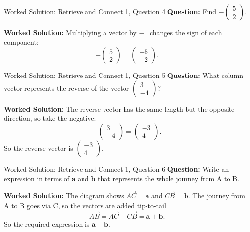 \documentclass{beamer}
\begin{document}
\begin{frame}{Worked Solution: Retrieve and Connect 1, Question 4}
\textbf{Question:} Find \(-\begin{pmatrix}5\\2\end{pmatrix}\).

\textbf{Worked Solution:}
Multiplying a vector by \(-1\) changes the sign of each component:
\[
-\begin{pmatrix}5\\2\end{pmatrix}
=
\begin{pmatrix}-5\\-2\end{pmatrix}.
\]

\end{frame}

\begin{frame}{Worked Solution: Retrieve and Connect 1, Question 5}
\textbf{Question:} What column vector represents the reverse of the vector \(\begin{pmatrix}3\\-4\end{pmatrix}\)?

\textbf{Worked Solution:}
The reverse vector has the same length but the opposite direction, so take the negative:
\[
-\begin{pmatrix}3\\-4\end{pmatrix}
=
\begin{pmatrix}-3\\4\end{pmatrix}.
\]
So the reverse vector is \(\begin{pmatrix}-3\\4\end{pmatrix}\).

\end{frame}

\begin{frame}{Worked Solution: Retrieve and Connect 1, Question 6}
\textbf{Question:} Write an expression in terms of \(\mathbf{a}\) and \(\mathbf{b}\) that represents the whole journey from A to B.

\textbf{Worked Solution:}
The diagram shows \(\overrightarrow{AC}=\mathbf{a}\) and \(\overrightarrow{CB}=\mathbf{b}\). The journey from A to B goes via C, so the vectors are added tip-to-tail:
\[
\overrightarrow{AB}
=
\overrightarrow{AC}+\overrightarrow{CB}
=
\mathbf{a}+\mathbf{b}.
\]
So the required expression is \(\mathbf{a}+\mathbf{b}\).

\end{frame}
\end{document}
